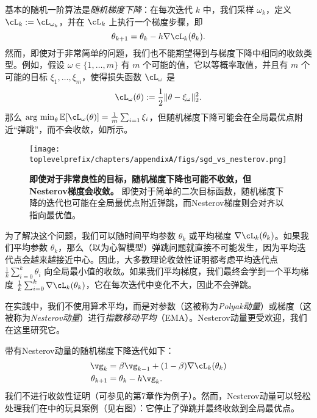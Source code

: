 \documentclass[../../book-main.tex]{subfiles}
\begin{document}
基本的随机一阶算法是\textit{随机梯度下降}：在每次迭代 \(k\) 中，我们采样 \(\omega_{k}\)，定义 \(\cL_{k} := \cL_{\omega_{k}}\)，并在 \(\cL_{k}\) 上执行一个梯度步骤，即
\begin{equation}
    \theta_{k + 1} = \theta_{k} - h\nabla \cL_{k}(\theta_{k}).
\end{equation}
然而，即使对于非常简单的问题，我们也不能期望得到与梯度下降中相同的收敛类型。例如，假设 \(\omega \in \{1, \dots, m\}\) 有 \(m\) 个可能的值，它以等概率取值，并且有 \(m\) 个可能的目标 \(\xi_{1}, \dots, \xi_{m}\)，使得损失函数 \(\cL_{\omega}\) 是
\begin{equation}
    \cL_{\omega}(\theta) := \frac{1}{2}\norm{\theta - \xi_{\omega}}_{2}^{2}.
\end{equation}
那么 \(\argmin_{\theta}\Ex[\cL_{\omega}(\theta)] = \frac{1}{m}\sum_{i = 1}\xi_{i}\)，但随机梯度下降可能会在全局最优点附近“弹跳”，而不会收敛，如所示。

\begin{figure}
    \texttt{[image: \\toplevelprefix/chapters/appendixA/figs/sgd\_vs\_nesterov.png]}
    \centering 
    \caption{\small\textbf{即使对于非常良性的目标，随机梯度下降也可能不收敛，但Nesterov梯度会收敛。} 即使对于简单的二次目标函数，随机梯度下降的迭代也可能在全局最优点附近弹跳，而Nesterov梯度则会对齐以指向最优值。}
    \label{fig:sgd_nonconvergence}
\end{figure}

为了解决这个问题，我们可以随时间平均参数 \(\theta_{k}\) 或平均梯度 \(\nabla \cL_{k}(\theta_{k})\)。如果我们平均参数 \(\theta_{k}\)，那么（以为心智模型）弹跳问题就直接不可能发生，因为平均迭代点会越来越接近中心。因此，大多数理论收敛性证明都考虑平均迭代点 \(\frac{1}{k}\sum_{i = 0}^{k}\theta_{i}\) 向全局最小值的收敛。如果我们平均梯度，我们最终会学到一个平均梯度 \(\frac{1}{k}\sum_{i = 0}^{k}\nabla \cL_{k}(\theta_{k})\)，它在每次迭代中变化不大，因此不会弹跳。

在实践中，我们不使用算术平均，而是对参数（这被称为\textit{Polyak动量}）或梯度（这被称为\textit{Nesterov动量}）进行\textit{指数移动平均}（EMA）。Nesterov动量更受欢迎，我们在这里研究它。

带有Nesterov动量的随机梯度下降迭代如下：
\begin{align}
    \vg_{k}
    &= \beta\vg_{k - 1} + (1 - \beta)\nabla \cL_{k}(\theta_{k}) \\ 
    \theta_{k + 1}
    &= \theta_{k} - h\vg_{k}.
\end{align}
我们不进行收敛性证明（可参见\cite{garrigos2023handbook}的第7章作为例子）。然而，Nesterov动量可以轻松处理我们在中的玩具案例（见右图）：它停止了弹跳并最终收敛到全局最优点。
\end{document}
